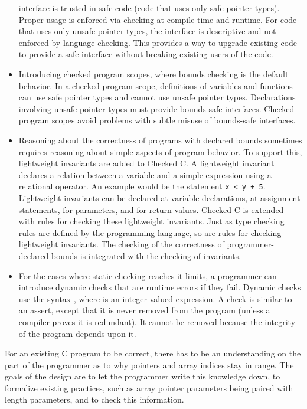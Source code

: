 \begin{itemize}
  interface is trusted in safe code (code that uses only safe pointer types).
  Proper usage is enforced via checking at compile time and runtime. For
  code that uses only unsafe pointer types, the interface is descriptive and 
  not enforced by
  language checking. This provides a way to upgrade existing code to
  provide a safe interface without breaking existing users of the code.
\item
  Introducing checked program scopes, where bounds checking is the
  default behavior. In a checked program scope, definitions of variables
  and functions can use safe pointer types and cannot use unsafe pointer
  types. Declarations involving unsafe pointer types must provide
  bounds-safe interfaces. Checked program scopes avoid problems with
  subtle misuse of bounds-safe interfaces.
\item
  Reasoning about the correctness of programs with declared bounds
  sometimes requires reasoning about simple aspects of program behavior.
  To support this, lightweight invariants are added to Checked C. A lightweight
  invariant declares a relation between a variable and a simple
  expression using a relational operator. An example would be the
  statement \texttt{x < y + 5}. Lightweight invariants can be
  declared at variable declarations, at assignment statements, for
  parameters, and for return values. Checked C is extended with rules for
  checking these lightweight invariants. Just as type checking rules are
  defined by the programming language, so are rules for checking
  lightweight invariants. The checking of the correctness of
  programmer-declared bounds is integrated with the checking of
  invariants.
\item
  For the cases where static checking reaches it limits, a programmer
  can introduce dynamic checks that are runtime errors if they fail.
  Dynamic checks use the syntax  , where  is an
  integer-valued expression. A check is similar to an assert, except
  that it is never removed from the program (unless a compiler proves
  it is redundant). It cannot be removed because the integrity of the
  program depends upon it.
\end{itemize}

For an existing C program to be correct, there has to be an
understanding on the part of the programmer as to why pointers and array
indices stay in range. The goals of the design are to let the programmer
write this knowledge down, to formalize existing practices, such as
array pointer parameters being paired with length parameters, and to
check this information.

